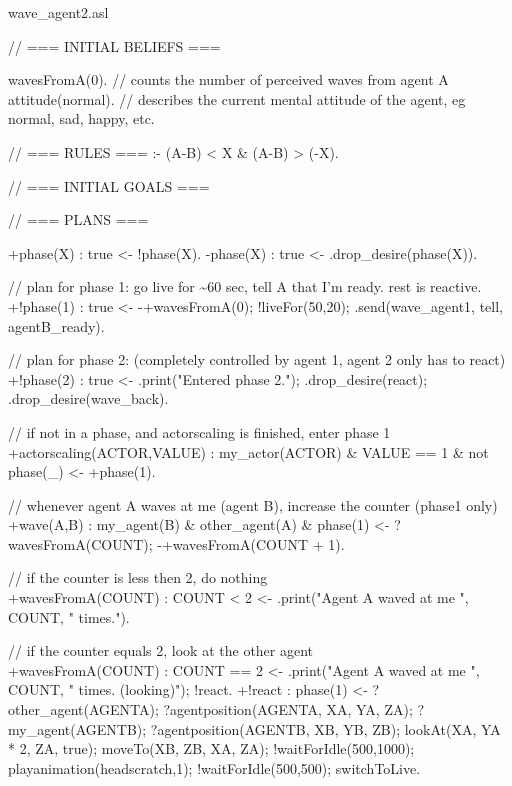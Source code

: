 \documentclass[draft,final]{vutinfth} %
\begin{document}
{\ttfamily\scriptsize\raggedright
wave\_agent2.asl

// === INITIAL BELIEFS ===

wavesFromA(0).                      // counts the number of perceived waves from agent A\\
attitude(normal).                   // describes the current mental attitude of the agent, eg normal, sad, happy, etc.

// === RULES ===
    :- (A-B) < X \& (A-B) > (-X).

// === INITIAL GOALS ===

// === PLANS ===

+phase(X) : true <- !phase(X).
-phase(X) : true <- .drop\_desire(phase(X)).

// plan for phase 1: go live for \~{}60 sec, tell A that I'm ready. rest is reactive.\\
+!phase(1) : true
                    <-  -+wavesFromA(0);
                        !liveFor(50,20);     
                        .send(wave\_agent1, tell, agentB\_ready).

// plan for phase 2: (completely controlled by agent 1, agent 2 only has to react)\\
+!phase(2) : true
                    <-  .print("Entered phase 2.");
                        .drop\_desire(react);
                        .drop\_desire(wave\_back).

// if not in a phase, and actorscaling is finished, enter phase 1\\
+actorscaling(ACTOR,VALUE) : my\_actor(ACTOR) \& VALUE == 1 \& not phase(\_)
                    <-  +phase(1).

// whenever agent A waves at me (agent B), increase the counter (phase1 only)\\
+wave(A,B) : my\_agent(B) \& other\_agent(A) \& phase(1)
                    <-  ?wavesFromA(COUNT);
                        -+wavesFromA(COUNT + 1).

// if the counter is less then 2, do nothing\\
+wavesFromA(COUNT) : COUNT < 2
                    <-  .print("Agent A waved at me ", COUNT, " times.").

// if the counter equals 2, look at the other agent\\
+wavesFromA(COUNT) : COUNT == 2
                    <-  .print("Agent A waved at me ", COUNT, " times. (looking)");
                        !react.
+!react : phase(1)
                    <-  ?other\_agent(AGENTA);
                        ?agentposition(AGENTA, XA, YA, ZA);
                        ?my\_agent(AGENTB);
                        ?agentposition(AGENTB, XB, YB, ZB);
                        lookAt(XA, YA * 2, ZA, true);
                        moveTo(XB, ZB, XA, ZA);
                        !waitForIdle(500,1000);
                        playanimation(headscratch,1);
                        !waitForIdle(500,500);
                        switchToLive.

}
\end{document}
